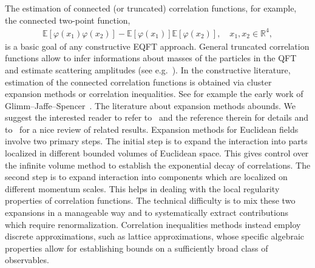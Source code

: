 \documentclass{article}
\begin{document}
The estimation of connected (or truncated) correlation functions, for
example, the connected two-point function,
\begin{equation}
  \begin{array}{l}
    \mathbb{E} [\varphi (x_1) \varphi (x_2)] -\mathbb{E} [\varphi (x_1)]
    \mathbb{E} [\varphi (x_2)], \quad x_1, x_2 \in \mathbb{R}^4,
  \end{array} \label{intro-corr}
\end{equation}
is a basic goal of any constructive EQFT approach. General truncated
correlation functions allow to infer informations about masses of the
particles in the QFT and estimate scattering amplitudes (see
e.g.~{\cite{H65}}).
%
In the constructive literature, estimation of the connected correlation
functions is obtained via cluster expansion methods or correlation
inequalities. See for example the early work of
Glimm--Jaffe--Spencer~{\cite{GJS73,GJS74}}. The literature about expansion
methods abounds. We suggest the interested reader to refer
to~{\cite{GlimmJaffe87,APS09,AKHZ89,DCGR20}} and the reference therein for
details and to~{\cite{J00}} for a nice review of related results. Expansion
methods for Euclidean fields involve two primary steps. The initial step is to expand the interaction into parts localized in different bounded volumes of Euclidean space. This gives control over the infinite volume method to
establish the exponential decay of correlations. The second step is to expand interaction into components which are localized on different momentum scales. This helps in dealing with the local regularity properties of correlation functions. The technical difficulty is to mix these two expansions in a manageable way and to systematically extract contributions which require renormalization.  Correlation inequalities methods instead employ discrete approximations, such as lattice approximations, whose specific algebraic properties allow for establishing bounds on a sufficiently broad class of observables. 
\end{document}
